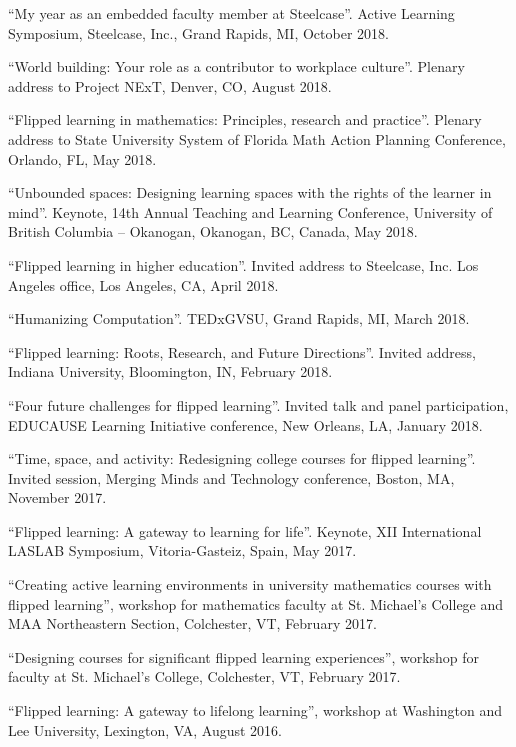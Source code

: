 \documentclass[letterpaper]{article}
\renewenvironment{itemize}{
  \begin{list}{}{
    \setlength{\leftmargin}{1.5em}
	\setlength{\itemsep}{0in}
  }
}{
  \end{list}
}
\begin{document}
\begin{itemize}
	\item ``My year as an embedded faculty member at Steelcase''. Active Learning Symposium, Steelcase, Inc., Grand Rapids, MI, October 2018.
   \item ``World building: Your role as a contributor to workplace culture''. Plenary address to Project NExT, Denver, CO, August 2018. 
   \item ``Flipped learning in mathematics: Principles, research and practice''. Plenary address to State University System of Florida Math Action Planning Conference, Orlando, FL, May 2018. 
   \item ``Unbounded spaces: Designing learning spaces with the rights of the learner in mind''. Keynote, 14th Annual Teaching and Learning Conference, University of British Columbia -- Okanogan, Okanogan, BC, Canada, May 2018. 
   \item ``Flipped learning in higher education''. Invited address to Steelcase, Inc. Los Angeles office, Los Angeles, CA, April 2018. 
   \item ``Humanizing Computation''. TEDxGVSU, Grand Rapids, MI, March 2018. 
   \item ``Flipped learning: Roots, Research, and Future Directions''. Invited address, Indiana University, Bloomington, IN, February 2018. 
   \item ``Four future challenges for flipped learning''. Invited talk and panel participation, EDUCAUSE Learning Initiative conference, New Orleans, LA, January 2018. 
   \item ``Time, space, and activity: Redesigning college courses for flipped learning''. Invited session, Merging Minds and Technology conference, Boston, MA, November 2017. 
   \item ``Flipped learning: A gateway to learning for life''. Keynote, XII International LASLAB Symposium, Vitoria-Gasteiz, Spain, May 2017. 
  \item ``Creating active learning environments in university mathematics courses with flipped learning'', workshop for mathematics faculty at St. Michael's College and MAA Northeastern Section, Colchester, VT, February 2017.
  \item ``Designing courses for significant flipped learning experiences'', workshop for faculty at St. Michael's College, Colchester, VT, February 2017.
  	\item ``Flipped learning: A gateway to lifelong learning'', workshop at Washington and Lee University, Lexington, VA, August 2016.

\end{itemize}
\end{document}
